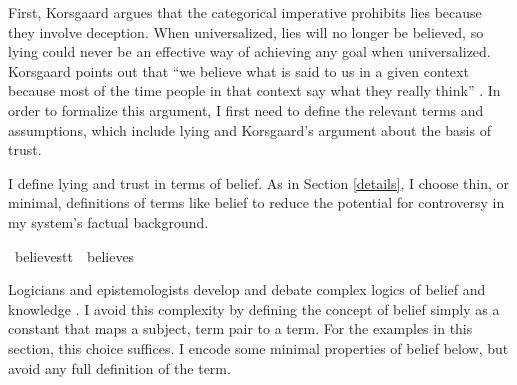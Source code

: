 \begin{isabellebody}
\begin{isamarkuptext}
First, Korsgaard argues that the categorical imperative prohibits lies because they involve deception. 
When universalized, lies will no longer be believed, so lying could never be an effective way of achieving 
any goal when universalized. Korsgaard points out that ``we believe what is said to us in a given 
context because most of the time people in that context say what they really think'' \citep[4]{KorsgaardRTL}. 
In order to formalize this argument, I first need to define the relevant terms and assumptions, which include
lying and Korsgaard's argument about the basis of trust.

I define lying and trust in terms of belief. As in Section \ref{details}, I choose thin, or minimal,
definitions of terms like belief to reduce the potential for controversy in my system's factual background.%
\end{isamarkuptext}\isamarkuptrue%
\isamarkupfalse%
\ believe{\isacharcolon}{\isacharcolon}{\isachardoublequoteopen}s{\isasymRightarrow}t{\isasymRightarrow}t{\isachardoublequoteclose}\ {\isacharparenleft}{\isachardoublequoteopen}{\isacharunderscore}\ believes\ {\isacharunderscore}{\isachardoublequoteclose}{\isacharparenright}\isanewline
%
%
\begin{isamarkuptext}%
Logicians and epistemologists develop and debate complex logics of belief and knowledge \citep{seplogicbelief}. 
I avoid this complexity by defining the concept of belief simply as a constant that maps a subject, term pair 
to a term. For the examples in this section, this choice suffices. 
I encode some minimal properties of belief below, but avoid any full definition of the term. 


\end{isamarkuptext}
\end{isabellebody}
